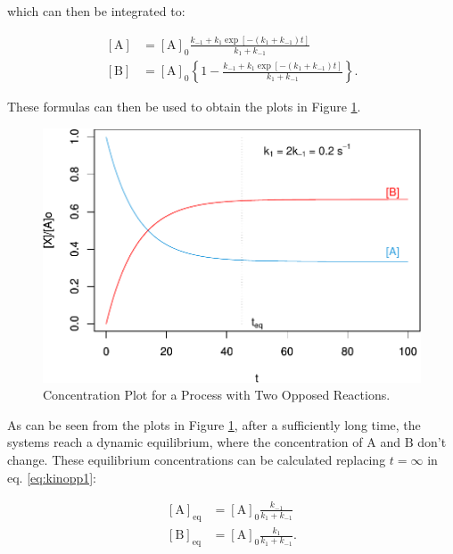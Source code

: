 \documentclass[
  9pt,
]{extbook}
\theoremstyle{definition}
\theoremstyle{definition}
\theoremstyle{definition}
\theoremstyle{definition}
\theoremstyle{remark}
\begin{document}
which can then be integrated to:

\begin{equation}
\begin{aligned}
\left[\mathrm{A}\right] &=[\mathrm{A}]_0\frac{k_{-1}+k_1\exp[-(k_1+k_{-1})t]}{k_1+k_{-1}} \\
\left[\mathrm{B}\right] &=[\mathrm{A}]_0\left\{ 1-\frac{k_{-1}+k_1\exp[-(k_1+k_{-1})t]}{k_1+k_{-1}}\right\}.
\end{aligned}
\label{eq:kinopp2}
\end{equation}

These formulas can then be used to obtain the plots in Figure \ref{fig:figkK}.

\begin{figure}

{\centering \includegraphics{pchem1_files/figure-latex/figkK-1} 

}

\caption{Concentration Plot for a Process with Two Opposed Reactions.}\label{fig:figkK}
\end{figure}

As can be seen from the plots in Figure \ref{fig:figkK}, after a sufficiently long time, the systems reach a dynamic equilibrium, where the concentration of \(\mathrm{A}\) and \(\mathrm{B}\) don't change. These equilibrium concentrations can be calculated replacing \(t=\infty\) in eq. \eqref{eq:kinopp1}:

\begin{equation}
\begin{aligned}
\left[\mathrm{A} \right] _{\mathrm{eq}} &= [\mathrm{A}]_0 \frac{k_{-1}}{k_1+k_{-1}} \\
[\mathrm{B}]_{\mathrm{eq}} &= [\mathrm{A}]_0 \frac{k_{1}}{k_1+k_{-1}}.
\end{aligned}
\label{eq:kinopp3}
\end{equation}
\end{document}
